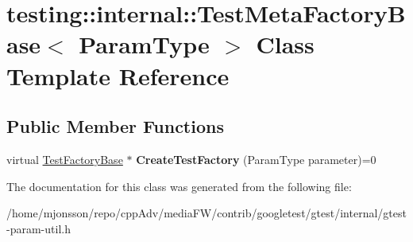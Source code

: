 \hypertarget{classtesting_1_1internal_1_1TestMetaFactoryBase}{}\section{testing\+:\+:internal\+:\+:Test\+Meta\+Factory\+Base$<$ Param\+Type $>$ Class Template Reference}
\label{classtesting_1_1internal_1_1TestMetaFactoryBase}
\subsection*{Public Member Functions}
\begin{DoxyCompactItemize}
\item 
\mbox{\label{classtesting_1_1internal_1_1TestMetaFactoryBase_a853daab362740bcac55e180128d564ef}} 
virtual \hyperlink{classtesting_1_1internal_1_1TestFactoryBase}{Test\+Factory\+Base} $\ast$ {\bfseries Create\+Test\+Factory} (Param\+Type parameter)=0
\end{DoxyCompactItemize}


The documentation for this class was generated from the following file\+:\begin{DoxyCompactItemize}
\item 
/home/mjonsson/repo/cpp\+Adv/media\+F\+W/contrib/googletest/gtest/internal/gtest-\/param-\/util.\+h\end{DoxyCompactItemize}
